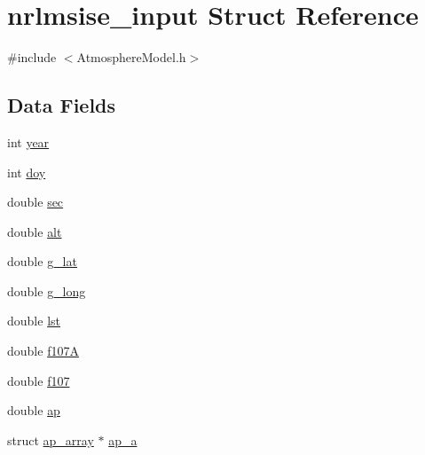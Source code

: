 \hypertarget{structnrlmsise__input}{\section{nrlmsise\+\_\+input Struct Reference}
\label{structnrlmsise__input}
}


{\ttfamily \#include $<$Atmosphere\+Model.\+h$>$}

\subsection*{Data Fields}
\begin{DoxyCompactItemize}
\item 
int \hyperlink{structnrlmsise__input_a32893d62ceca558ccfb7e34789ea9536}{year}
\item 
int \hyperlink{structnrlmsise__input_a81329554920ba6f7180d427ab7a3b907}{doy}
\item 
double \hyperlink{structnrlmsise__input_a696afdcb8f4f94993f5a88e29c1b7a68}{sec}
\item 
double \hyperlink{structnrlmsise__input_a102b283f83c88896582614654330d4d7}{alt}
\item 
double \hyperlink{structnrlmsise__input_ae3919a79645584e3cf537a82a958b734}{g\+\_\+lat}
\item 
double \hyperlink{structnrlmsise__input_a7bd53a112c70d2ccbab37096541dd4bc}{g\+\_\+long}
\item 
double \hyperlink{structnrlmsise__input_ac41fa549d9cfb5f0f4b93c744d9225ce}{lst}
\item 
double \hyperlink{structnrlmsise__input_a067d86f0e8c35a6d2b3c9acf0d4a2b40}{f107\+A}
\item 
double \hyperlink{structnrlmsise__input_aaf339ba3dc1807f2a606215c6ec99502}{f107}
\item 
double \hyperlink{structnrlmsise__input_a65c8e469eba33cd0661c438ab2aedcb6}{ap}
\item 
struct \hyperlink{structap__array}{ap\+\_\+array} $\ast$ \hyperlink{structnrlmsise__input_a60e2d0c5b6b229eaead58be694110631}{ap\+\_\+a}
\end{DoxyCompactItemize}


